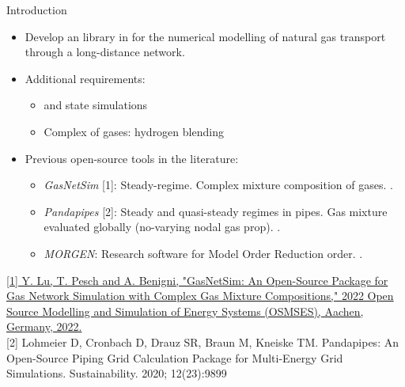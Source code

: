 \begin{frame}{Introduction}

\begin{itemize}
\item Develop an   library in  for the numerical modelling of natural gas transport through a long-distance network. 
\item Additional requirements: 
	\begin{itemize}
	\item {} and  state simulations
	\item Complex  of gases: hydrogen blending
	\end{itemize}
\item Previous open-source tools in the literature: 
    \begin{itemize}
    	\item \textit{GasNetSim} [1]: Steady-regime. Complex mixture composition of gases. .
    	\item \textit{Pandapipes} [2]: Steady and quasi-steady regimes in pipes.  Gas mixture evaluated globally (no-varying nodal gas prop).  .
    	\item \textit{MORGEN}: Research software for Model Order Reduction order. .
    \end{itemize} 
\end{itemize}


\href{https://ieeexplore.ieee.org/document/9769148} {[1]  \scriptsize Y. Lu, T. Pesch and A. Benigni, "GasNetSim: An Open-Source Package for Gas Network Simulation with Complex Gas Mixture Compositions," 2022 Open Source Modelling and Simulation of Energy Systems (OSMSES), Aachen, Germany, 2022.} \\
{[2] \scriptsize Lohmeier D, Cronbach D, Drauz SR, Braun M, Kneiske TM. Pandapipes: An Open-Source Piping Grid Calculation Package for Multi-Energy Grid Simulations. Sustainability. 2020; 12(23):9899}
\end{frame}

